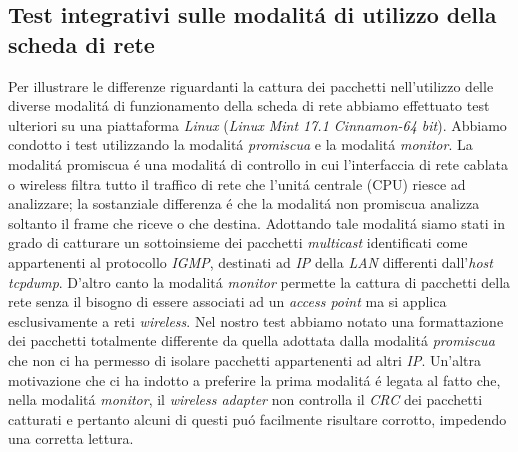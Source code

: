 \documentclass[12pt]{article} %
\begin{document}
\subsection{Test integrativi sulle modalit\'a di utilizzo della scheda di rete}
Per illustrare le differenze riguardanti la cattura dei pacchetti nell'utilizzo delle diverse modalit\'a di funzionamento della scheda di rete abbiamo effettuato test ulteriori su una piattaforma \textit{Linux} (\textit{Linux Mint 17.1 Cinnamon-64 bit}). Abbiamo condotto i test utilizzando la modalit\'a \textit{promiscua} e la modalit\'a \textit{monitor}. La modalit\'a promiscua \'e una modalit\'a di controllo in cui l'interfaccia di rete cablata o wireless filtra tutto il traffico di rete che l'unit\'a centrale (CPU) riesce ad analizzare; la sostanziale differenza \'e che la modalit\'a non promiscua analizza soltanto il frame che riceve o che destina. Adottando tale modalit\'a siamo stati in grado di catturare un sottoinsieme dei pacchetti \textit{multicast} identificati come appartenenti al protocollo \textit{IGMP}, destinati ad \textit{IP} della \textit{LAN} differenti dall'\textit{host tcpdump}. D'altro canto la modalit\'a \textit{monitor} permette la cattura di pacchetti della rete senza il bisogno di essere associati ad un \textit{access point} ma si applica esclusivamente a reti \textit{wireless}. Nel nostro test abbiamo notato una formattazione dei pacchetti totalmente differente da quella adottata dalla modalit\'a \textit{promiscua} che non ci ha permesso di isolare pacchetti appartenenti ad altri \textit{IP}. Un'altra motivazione che ci ha indotto a preferire la prima modalit\'a \'e legata al fatto che, nella modalit\'a \textit{monitor}, il \textit{wireless adapter} non controlla il \textit{CRC} dei pacchetti catturati e pertanto alcuni di questi pu\'o facilmente risultare corrotto, impedendo una corretta lettura.  
 

\end{document}
